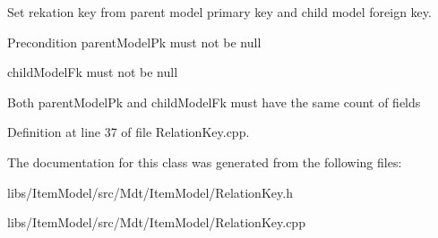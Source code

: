 Set rekation key from parent model primary key and child model foreign key. 

\begin{DoxyPrecond}{Precondition}
parent\+Model\+Pk must not be null 

child\+Model\+Fk must not be null 

Both parent\+Model\+Pk and child\+Model\+Fk must have the same count of fields 
\end{DoxyPrecond}


Definition at line 37 of file Relation\+Key.\+cpp.



The documentation for this class was generated from the following files\+:\begin{DoxyCompactItemize}
\item 
libs/\+Item\+Model/src/\+Mdt/\+Item\+Model/Relation\+Key.\+h\item 
libs/\+Item\+Model/src/\+Mdt/\+Item\+Model/Relation\+Key.\+cpp\end{DoxyCompactItemize}
